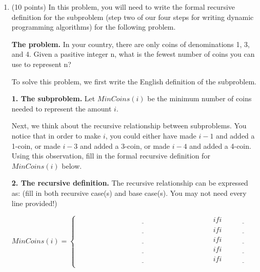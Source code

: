 \documentclass[11pt]{article}
\begin{document}
\begin{enumerate}
\begin{equation*}
\begin{cases}
    \end{cases}
\end{equation*}

The first node is provided for you.

\begin{center}
\end{center}
\vspace{2in}


    \item (10 points)
    In this problem, you will need to write the formal recursive definition
    for the subproblem (step two of our four steps for writing dynamic programming algorithms)
    for the following problem.
    
    \textbf{The problem.} In your country, there are only coins of denominations
    1, 3, and 4. Given a pasitive integer n, what is the fewest number of
    coins you can use to represent n?

    To solve this problem, we first write the English definition of the subproblem.

    \textbf{1. The subproblem.} Let $MinCoins(i)$ be the minimum number of coins needed to represent the amount $i$.

    Next, we think about the recursive relationship between subproblems. You notice that in order to make $i$,
    you could either have made $i-1$ and added a 1-coin, or made $i-3$ and added a 3-coin,
    or made $i-4$ and added a 4-coin. Using this observation, fill in the formal recursive
    definition for $MinCoins(i)$ below.

    \textbf{2. The recursive definition.} The recursive relationship can be expressed as:
    (fill in both recursive case(s) and base case(s). You may not need every line provided!)

    \begin{equation*}
        MinCoins(i) =
        \begin{cases}
        \underline{\hspace{3in}} & if i \underline{\hspace{1in}} \\
        \underline{\hspace{3in}} & if i \underline{\hspace{1in}} \\
        \underline{\hspace{3in}} & if i \underline{\hspace{1in}} \\
        \underline{\hspace{3in}} & if i \underline{\hspace{1in}} \\
        \underline{\hspace{3in}} & if i \underline{\hspace{1in}} \\
        \end{cases}
    \end{equation*}


\end{enumerate}
\end{document}
